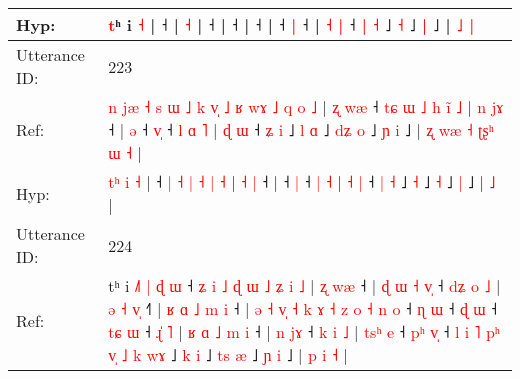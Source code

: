 \documentclass[10pt]{article}
\DeclareRobustCommand{\hl}[1]{{\textcolor{red}{#1}}}
\begin{document}
\begin{longtable}{ll}
 \\
Hyp: & \hl{}\hl{}\hl{}\hl{}\hl{}\hl{}\hl{}\hl{}\hl{}\hl{}\hl{}\hl{}\hl{}\hl{}\hl{}\hl{}\hl{}\hl{}\hl{}\hl{}\hl{}\hl{}\hl{}\hl{}\hl{t}ʰ i \hl{˧} |\hl{}\hl{}\hl{}\hl{}\hl{} ˧ |\hl{}\hl{}\hl{} \hl{}\hl{˧} |\hl{}\hl{}\hl{}\hl{}\hl{} ˧ |\hl{}\hl{}\hl{} ˧\hl{}\hl{}\hl{}\hl{}\hl{}\hl{}\hl{}\hl{}\hl{}\hl{}\hl{}\hl{} |\hl{}\hl{}\hl{}\hl{}\hl{} ˧\hl{}\hl{}\hl{}\hl{}\hl{}\hl{}\hl{}\hl{}\hl{}\hl{}\hl{}\hl{}\hl{}\hl{}\hl{}\hl{}\hl{}\hl{}\hl{} |\hl{}\hl{}\hl{}\hl{}\hl{}\hl{} ˧\hl{}\hl{} \hl{|} ˧\hl{}\hl{}\hl{}\hl{}\hl{}\hl{} | \hl{˧} \hl{}\hl{|} ˧ \hl{}\hl{|} \hl{˧} ˩\hl{}\hl{} \hl{˧} ˩\hl{}\hl{}\hl{} \hl{|} ˩ |\hl{}\hl{} \hl{}\hl{˩} \hl{|}
 \\
\midrule
Utterance ID: & 223 \\
Ref: & \hl{n}\hl{ }\hl{j}\hl{æ}\hl{ }\hl{˧}\hl{ }\hl{s}\hl{ }\hl{ɯ}\hl{ }\hl{˩}\hl{ }\hl{k}\hl{ }\hl{v}\hl{̩}\hl{ }\hl{˩}\hl{ }\hl{ʁ}\hl{ }\hl{w}\hl{ɤ}\hl{ }\hl{˩}\hl{ }\hl{q} \hl{o} \hl{˩} |\hl{ }\hl{ʐ}\hl{ }\hl{w}\hl{æ} ˧ \hl{t}\hl{ɕ} \hl{ɯ} \hl{˩} \hl{h} \hl{i}\hl{̃} \hl{˩} | \hl{n} \hl{j}\hl{ɤ} ˧ |\hl{ }\hl{ə} ˧ \hl{v}\hl{̩} ˧\hl{ }\hl{l} \hl{ɑ} \hl{˥} | \hl{ɖ} \hl{ɯ} ˧ \hl{ʑ} \hl{i} ˩\hl{ }\hl{l} \hl{ɑ} ˩\hl{ }\hl{d}\hl{ʑ} \hl{o} ˩\hl{ }\hl{ɲ} \hl{i} ˩ |\hl{ }\hl{ʐ}\hl{ }\hl{w}\hl{æ}\hl{ }\hl{˧}\hl{ }\hl{ʈ}\hl{ʂ}\hl{ʰ}\hl{ }\hl{ɯ} \hl{˧} |
 \\
Hyp: & \hl{}\hl{}\hl{}\hl{}\hl{}\hl{}\hl{}\hl{}\hl{}\hl{}\hl{}\hl{}\hl{}\hl{}\hl{}\hl{}\hl{}\hl{}\hl{}\hl{}\hl{}\hl{}\hl{}\hl{}\hl{}\hl{}\hl{t}\hl{ʰ} \hl{i} \hl{˧} |\hl{}\hl{}\hl{}\hl{}\hl{} ˧ \hl{}\hl{|} \hl{˧} \hl{|} \hl{˧} \hl{}\hl{|} \hl{˧} | \hl{˧} \hl{}\hl{|} ˧ |\hl{}\hl{} ˧ \hl{}\hl{|} ˧\hl{}\hl{} \hl{|} \hl{˧} | \hl{˧} \hl{|} ˧ \hl{|} \hl{˧} ˩\hl{}\hl{} \hl{˧} ˩\hl{}\hl{}\hl{} \hl{˧} ˩\hl{}\hl{} \hl{|} ˩ |\hl{}\hl{}\hl{}\hl{}\hl{}\hl{}\hl{}\hl{}\hl{}\hl{}\hl{}\hl{}\hl{} \hl{˩} |
 \\
\midrule
Utterance ID: & 224 \\
Ref: & tʰ i\hl{ }\hl{˩}\hl{˥}\hl{ }\hl{|}\hl{ }\hl{ɖ}\hl{ }\hl{ɯ} ˧\hl{ }\hl{ʑ}\hl{ }\hl{i}\hl{ }\hl{˩}\hl{ }\hl{ɖ}\hl{ }\hl{ɯ}\hl{ }\hl{˩}\hl{ }\hl{ʑ}\hl{ }\hl{i}\hl{ }\hl{˩} |\hl{ }\hl{ʐ}\hl{ }\hl{w}\hl{æ} ˧ |\hl{ }\hl{ɖ}\hl{ }\hl{ɯ}\hl{ }\hl{˧}\hl{ }\hl{v}\hl{̩} ˧\hl{ }\hl{d}\hl{ʑ}\hl{ }\hl{o}\hl{ }\hl{˩} |\hl{ }\hl{ə}\hl{ }\hl{˧}\hl{ }\hl{v}\hl{̩} ˧\hl{˥} |\hl{ }\hl{ʁ}\hl{ }\hl{ɑ}\hl{ }\hl{˩}\hl{ }\hl{m}\hl{ }\hl{i} ˧ |\hl{ }\hl{ə}\hl{ }\hl{˧}\hl{ }\hl{v}\hl{̩}\hl{ }\hl{˧}\hl{ }\hl{k}\hl{ }\hl{ɤ}\hl{ }\hl{˧}\hl{ }\hl{z}\hl{ }\hl{o}\hl{ }\hl{˧}\hl{ }\hl{n}\hl{ }\hl{o} ˧\hl{ }\hl{ɳ} \hl{ɯ} ˧\hl{ }\hl{ɖ} \hl{ɯ} ˧\hl{ }\hl{t}\hl{ɕ} \hl{ɯ} ˧\hl{ }\hl{ɻ}\hl{̍}\hl{ }\hl{˥} |\hl{ }\hl{ʁ}\hl{ }\hl{ɑ}\hl{ }\hl{˩}\hl{ }\hl{m}\hl{ }\hl{i} ˧ |\hl{ }\hl{n}\hl{ }\hl{j}\hl{ɤ} ˧\hl{ }\hl{k}\hl{ }\hl{i}\hl{ }\hl{˩} |\hl{ }\hl{t}\hl{s}\hl{ʰ}\hl{ }\hl{e} ˧\hl{ }\hl{p}\hl{ʰ} \hl{v}\hl{̩} ˧\hl{ }\hl{l}\hl{ }\hl{i}\hl{ }\hl{˥}\hl{ }\hl{p}\hl{ʰ}\hl{ }\hl{v}\hl{̩}\hl{ }\hl{˩}\hl{ }\hl{k}\hl{ }\hl{w}\hl{ɤ} ˩\hl{ }\hl{k} \hl{i} ˩\hl{ }\hl{t}\hl{s} \hl{æ} ˩\hl{ }\hl{ɲ} \hl{i} ˩ |\hl{ }\hl{p}\hl{ }\hl{i} \hl{˧} |

\end{longtable}
\end{document}
